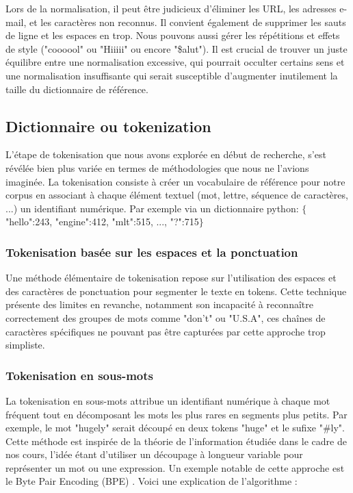 \documentclass[12pt]{article}
\theoremstyle{definition}
\begin{document}
	 Lors de la normalisation, il peut être judicieux d'éliminer les URL, les adresses e-mail, et les caractères non reconnus. Il convient également de supprimer les sauts de ligne et les espaces en trop. Nous pouvons aussi gérer les répétitions et effets de style ("coooool" ou "Hiiiii" ou encore "\$alut"). Il est crucial de trouver un juste équilibre entre une normalisation excessive, qui pourrait occulter certains sens et une normalisation insuffisante qui serait susceptible d'augmenter inutilement la taille du dictionnaire de référence.
	\subsection{Dictionnaire ou tokenization}
	
	L'étape de tokenisation que nous avons explorée en début de recherche, s'est révélée bien plus variée en termes de méthodologies que nous ne l'avions imaginée. La tokenisation consiste à créer un vocabulaire de référence pour notre corpus en associant à chaque élément textuel (mot, lettre, séquence de caractères, ...) un identifiant numérique. Par exemple via un dictionnaire python: $\{$"hello":243, "engine":412, "mlt":515, ..., "?":715$\}$ 
	

	\subsubsection{Tokenisation basée sur les espaces et la ponctuation}
	Une méthode élémentaire de tokenisation repose sur l'utilisation des espaces et des caractères de ponctuation pour segmenter le texte en tokens. Cette technique présente des limites en revanche, notamment son incapacité à reconnaître correctement des groupes de mots comme "don't" ou "U.S.A", ces chaînes de caractères spécifiques ne pouvant pas être capturées par cette approche trop simpliste.
	
	\subsubsection{Tokenisation en sous-mots}
	
	La tokenisation en sous-mots attribue un identifiant numérique à chaque mot fréquent tout en décomposant les mots les plus rares en segments plus petits. Par exemple, le mot "hugely" serait découpé en deux tokens "huge" et le sufixe "\#ly". Cette méthode est inspirée de la théorie de l'information étudiée dans le cadre de nos cours, l'idée étant d'utiliser un découpage à longueur variable pour représenter un mot ou une expression. Un exemple notable de cette approche est le Byte Pair Encoding (BPE) \cite{BPE}. Voici une explication de l'algorithme : 
	
\end{document}
